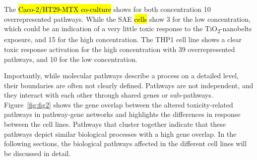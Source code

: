 \documentclass[ijms,article,submit,moreauthors,pdftex]{Definitions/mdpi}
\begin{document}
The \hl{Caco-2/HT29-MTX co-culture} shows for both concentration 10 overrepresented pathways. While the SAE \hl{cells} show 3 for the low concentration, which could be an indication of a very little toxic response to the TiO\textsubscript{2}-nanobelts exposure, and 15 for the high concentration. The THP1 cell line shows a clear toxic response activation for the high concentration with 39 overrepresented pathways, and 10 for the low concentration.


\begin{table}[]
\caption{Table depicting the number of significantly overrepresented pathways, altered toxicity pathways and the number of altered toxicity pathways for each GO-term.}
\end{table}


Importantly, while molecular pathways describe a process on a detailed level, their boundaries are often not clearly defined. Pathways are not independent, and they interact with each other through shared genes or sub-pathways. Figure~\ref{fig:fig2} shows the gene overlap between the altered toxicity-related pathways in pathway-gene networks and highlights the differences in response between the cell lines. Pathways that cluster together indicate that these pathways depict similar biological processes with a high gene overlap. In the following sections, the biological pathways affected in the different cell lines will be discussed in detail.
\end{document}
